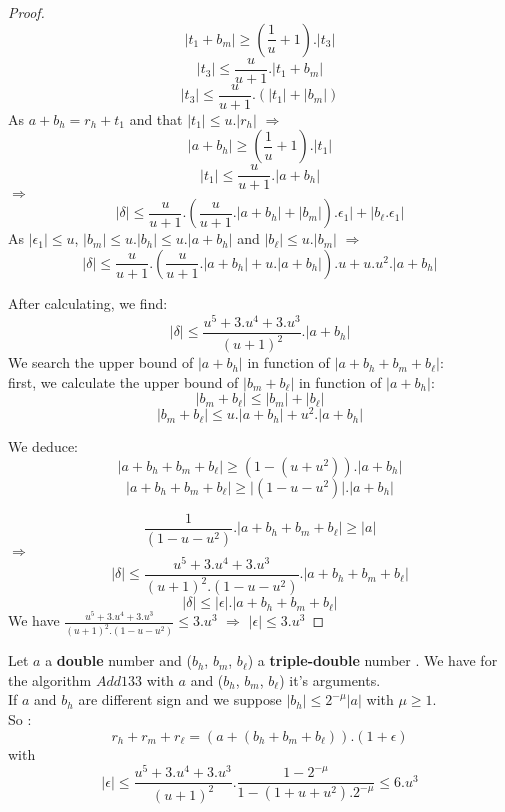 \begin{proof}
$$ \lvert t_1 + b_m \rvert  \ge (\frac{1}{u}+1). \lvert t_3 \rvert $$
$$ \lvert t_3 \rvert  \le \frac{u}{u+1}. \lvert t_1 + b_m  \rvert $$
$$ \lvert t_3 \rvert  \le \frac{u}{u+1}. (\lvert t_1 \rvert + \lvert b_m  \rvert) $$
As $a + b_h = r_h + t_1$ and that $ \lvert t_1 \rvert \le u.\lvert r_h \rvert $ $\Rightarrow$ 
$$ \lvert a + b_h  \rvert  \ge (\frac{1}{u}+1). \lvert t_1 \rvert $$
$$ \lvert t_1 \rvert  \le \frac{u}{u+1}. \lvert a + b_h  \rvert $$
$\Rightarrow$
$$ \lvert \delta \rvert \le \frac{u}{u+1}.(\frac{u}{u+1}. \lvert a + b_h  \rvert +  \lvert b_m \rvert).\epsilon_1 \rvert +\lvert b_{\ell}.\epsilon_1 \rvert $$
As $\lvert \epsilon_1 \rvert \le u$, $ \lvert b_m \rvert \le u.\lvert b_h \rvert \le u.\lvert a + b_h \rvert $ and $\lvert b_{\ell} \rvert \le u.\lvert b_m \rvert$ $\Rightarrow$
$$ \lvert \delta \rvert \le \frac{u}{u+1}.(\frac{u}{u+1}. \lvert a + b_h  \rvert + u .\lvert  a+b_h \rvert).u  +u.u^2 .\lvert  a+b_h \rvert $$

After calculating, we find:\\
$$ \lvert \delta \rvert \le \frac{u^5+3.u^4+3.u^3}{(u+1)^2}.\lvert a + b_h\rvert $$
We search the upper bound of $\lvert a +b_h \rvert $ in function of $\lvert a+b_h +b_m + b_{\ell} \rvert $:\\
first, we calculate the upper bound of $\lvert b_m + b_{\ell} \rvert$ in function of $\lvert a +b_h \rvert$:
$$\lvert b_m + b_{\ell} \rvert \le  \lvert b_m \rvert + \lvert b_{\ell} \rvert  $$
$$\lvert b_m + b_{\ell} \rvert \le  u.\lvert a +b_h \rvert + u^2.\lvert a +b_h\rvert  $$

We deduce:
$$\lvert a+b_h +b_m + b_{\ell} \rvert \ge (1-( u +u^2)).\lvert a + b_h \rvert $$
$$\lvert a+b_h +b_m + b_{\ell} \rvert \ge \lvert (1-u -u^2) \rvert .\lvert a +b_h \rvert $$

$$ \frac{1}{(1- u -u^2)}.\lvert a+b_h +b_m + b_{\ell} \rvert \ge  \lvert a \rvert $$
$\Rightarrow$
$$ \lvert \delta \rvert \le \frac{u^5+3.u^4+3.u^3}{(u+1)^2.(1-u-u^2)}.\lvert a+b_h +b_m + b_{\ell} \rvert $$
$$ \lvert \delta \rvert \le \lvert \epsilon \rvert.\lvert a+b_h +b_m + b_{\ell} \rvert $$
We have $\frac{u^5+3.u^4+3.u^3}{(u+1)^2.(1-u-u^2)} \le 3.u^3$ $\Rightarrow$ $\lvert \epsilon \rvert \le  3.u^3 $
\end{proof}

\begin{theo}
Let $a$ a \textbf{double} number and ($b_h$, $b_m$, $b_{\ell}$) a \textbf{triple-double} number . We have for the algorithm $Add133$ with
$a$ and ($b_h$, $b_m$, $b_{\ell}$) it's arguments.\\
If $a$ and $b_h$ are different sign and we suppose $\lvert b_h \rvert \le 2^{-\mu} \lvert a \rvert $ with $\mu \ge 1$.\\
So :
$$r_h +r_m +r_{\ell} = (a+ (b_h+ b_m +b_{\ell})).(1+\epsilon)$$
with $$\lvert \epsilon \rvert \le  \frac{u^5+3.u^4+3.u^3}{(u+1)^2} .\frac{1 - 2^{-\mu}}{1 -(1+u+u^2).2^{-\mu}} \le 6.u^3$$
\end{theo}

